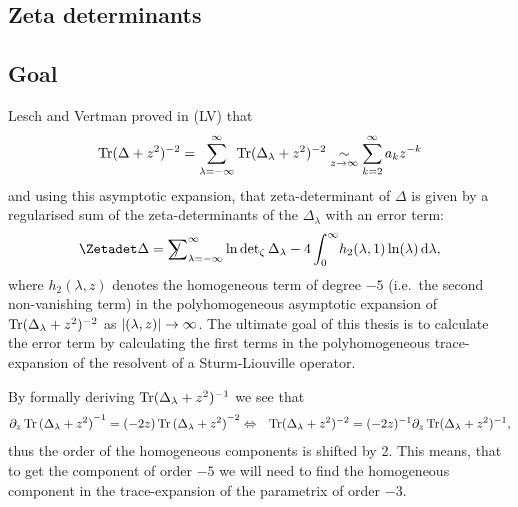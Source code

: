 \subsection{Zeta determinants}
    
\subsection{Goal}
Lesch and Vertman proved in (LV) that
\begin{align}
  \operatorname{Tr}(\Delta + z^2)^{-2} = \sum_{\lambda=-\infty}^\infty \operatorname{Tr}(\Delta_\lambda +
  z^2)^{-2} \mathrel{\underset{z\to\infty}{\sim}} \sum_{k=2}^{\infty} a_kz^{-k}
\end{align}
and using this asymptotic expansion, that zeta-determinant of $\Delta$ is given
by a regularised sum of the zeta-determinants of the $\Delta_\lambda$ with an
error term:
\begin{align}
  \Zetadet \Delta = \Regsum_{\lambda=-\infty}^\infty
  \ln\operatorname{det}_\zeta\Delta_\lambda -
  4\Integ[\infty]{0}{\lambda}{h_2(\lambda, 1)\ln(\lambda)},
\end{align}
where $h_2(\lambda, z)$ denotes the homogeneous term of degree $-5$ (i.e.\ the second
non-vanishing term) in the polyhomogeneous asymptotic expansion of
$\operatorname{Tr}(\Delta_\lambda + z^2)^{-2}$ as $\left|(\lambda, z)\right|\to\infty$. The ultimate
goal of this thesis is to calculate the error term by calculating the
first terms in the polyhomogeneous trace-expansion of the resolvent of a
Sturm-Liouville operator.

By formally deriving $\operatorname{Tr}(\Delta_\lambda + z^2)^{-1}$ we see that
\begin{align*}
  \partial_z \operatorname{Tr}{(\Delta_\lambda + z^2)}^{-1} &=
        (-2z) \operatorname{Tr}{(\Delta_\lambda + z^2)}^{-2}
        \Leftrightarrow& \operatorname{Tr}(\Delta_\lambda + z^2)^{-2} =
        (-2z)^{-1}\partial_z\operatorname{Tr}(\Delta_\lambda + z^2)^{-1},
\end{align*}
thus the order of the homogeneous components is shifted by 2. This means, that
to get the component of order $-5$ we will need to find the homogeneous
component in the trace-expansion of the parametrix of order $-3$.
